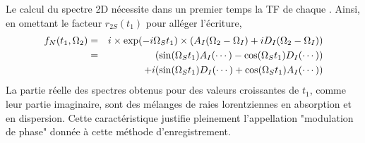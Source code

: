 Le calcul du spectre 2D nécessite dans un premier temps la TF de chaque {\FID}.
Ainsi, en omettant le facteur $r_{2S}(t_1)$ pour alléger l'écriture,
\begin{eqnarray}
f_N(t_1, \Omega_2) & = & i \times \exp(-i \Omega_S t_1)  
\times (A_I(\Omega_2 - \Omega_I) + i D_I(\Omega_2 - \Omega_I)) \\
& = & (\sin(\Omega_S t_1) A_I(\cdots) - \cos(\Omega_S t_1) D_I(\cdots)) \nonumber \\
& & + i(\sin(\Omega_S t_1) D_I(\cdots) + \cos(\Omega_S t_1) A_I(\cdots))
\end{eqnarray}
La partie réelle des spectres obtenus pour des valeurs croissantes de $t_1$,
comme leur partie imaginaire, sont des mélanges de raies lorentziennes
en absorption et en dispersion.
Cette caractéristique justifie pleinement l'appellation "modulation de phase"
donnée à cette méthode d'enregistrement.


